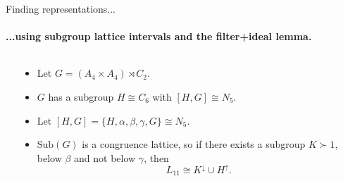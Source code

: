 \documentclass[xcolor=dvipsnames,9pt]{beamer}
\newcommand{\Sub}{\mbox{Sub}}
\newcommand{\<}{\langle}	     %
\renewcommand{\>}{\rangle}	     %
\begin{document}
\begin{frame}[label=knownresults,shrink=5]{Finding representations...}
  \framesubtitle{...using subgroup lattice intervals and the filter+ideal lemma.}

  \begin{columns}
    \begin{column}{0.2\textwidth}
      \begin{center}
      \end{center}
    \end{column}
    \begin{column}{0.6\textwidth}
      \vskip1cm
      \begin{itemize}
      \item<2-> 
        Let $G=(A_4 \times A_4) \rtimes C_2$. %
      \item<2-> $G$ has a subgroup $H \cong C_6$ with $[H, G] \cong N_5$. \hskip6pt %
      \item<2-> Let $[H, G] = \{H, \alpha, \beta, \gamma, G\} \cong N_5$.\vskip6pt
      \item<3-> $\Sub(G)$ is a congruence lattice, so
        if there exists a subgroup $K \succ 1$, below $\beta$ and not below $\gamma$, 
        then \[L_{11} \cong K^\downarrow \cup H^\uparrow.\]
      \end{itemize}
    \end{column}
  \end{columns}


\end{frame}
\end{document}
